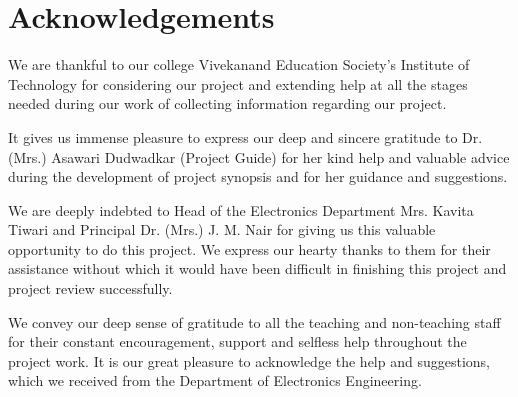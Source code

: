 \chapter*{Acknowledgements}

We are thankful to our college Vivekanand Education Society's Institute of Technology for considering our project and extending help at all the stages needed during our work of collecting information regarding our project. \par

It gives us immense pleasure to express our deep and sincere gratitude to Dr.(Mrs.) Asawari Dudwadkar (Project Guide) for her kind help and valuable advice during the development of project synopsis and for her guidance and suggestions.\par

We are deeply indebted to Head of the Electronics Department Mrs. Kavita Tiwari and Principal Dr. (Mrs.) J. M. Nair for giving us this valuable opportunity to do this project. We express our hearty thanks to them for their assistance without which it would have been difficult in finishing this project and project review successfully. \par

We convey our deep sense of gratitude to all the teaching and non-teaching staff for their constant encouragement, support and selfless help throughout the project work. It is our great pleasure to acknowledge the help and suggestions, which we received from the Department of Electronics Engineering.